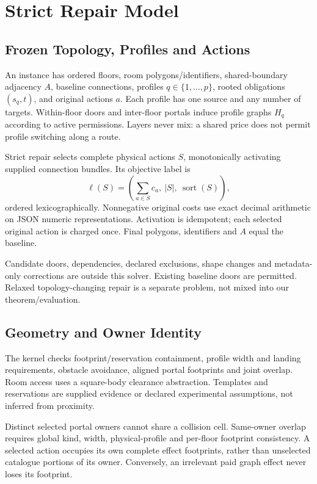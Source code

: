 \documentclass[conference]{IEEEtran}
\begin{document}
\section{Strict Repair Model}
\subsection{Frozen Topology, Profiles and Actions}
An instance has ordered floors, room polygons/identifiers, shared-boundary adjacency $A$, baseline connections, profiles $q\in\{1,\ldots,p\}$, rooted obligations $(s_q,t)$, and original actions $a$. Each profile has one source and any number of targets. Within-floor doors and inter-floor portals induce profile graphs $H_q$ according to active permissions. Layers never mix: a shared price does not permit profile switching along a route.

Strict repair selects complete physical actions $S$, monotonically activating supplied connection bundles. Its objective label is
\begin{equation}
\ell(S)=\left(\sum_{a\in S}c_a,\ |S|,\ \operatorname{sort}(S)\right),
\label{eq:objective}
\end{equation}
ordered lexicographically. Nonnegative original costs use exact decimal arithmetic on JSON numeric representations. Activation is idempotent; each selected original action is charged once. Final polygons, identifiers and $A$ equal the baseline.

Candidate doors, dependencies, declared exclusions, shape changes and metadata-only corrections are outside this solver. Existing baseline doors are permitted. Relaxed topology-changing repair is a separate problem, not mixed into our theorem/evaluation.

\subsection{Geometry and Owner Identity}
The kernel checks footprint/reservation containment, profile width and landing requirements, obstacle avoidance, aligned portal footprints and joint overlap. Room access uses a square-body clearance abstraction. Templates and reservations are supplied evidence or declared experimental assumptions, not inferred from proximity.

Distinct selected portal owners cannot share a collision cell. Same-owner overlap requires global kind, width, physical-profile and per-floor footprint consistency. A selected action occupies its own complete effect footprints, rather than unselected catalogue portions of its owner. Conversely, an irrelevant paid graph effect never loses its footprint.
\end{document}
